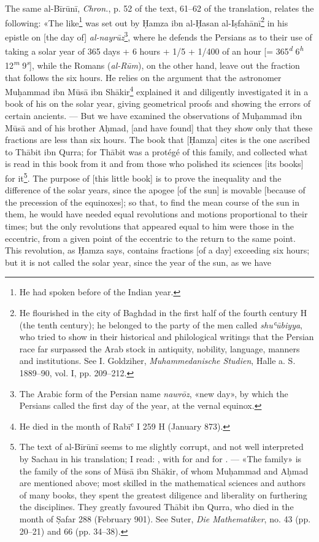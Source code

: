 \documentclass[11pt]{article}
\newcommand{\Pg}[1]{\marginpar{\footnotesize\color{gray}#1}}
\begin{document}
\par \Pg{I 208}The same al-Bīrūnī, \emph{Chron.}, p. 52 of the text, 61–62 of the translation, relates the following: «The like\footnote{He had spoken before of the Indian year.} was set out by Ḥamza ibn al-Ḥasan al-Iṣfahānī\footnote{He flourished in the city of Baghdad in the first half of the fourth century H (the tenth century); he belonged to the party of the men called \emph{shuʿūbiyya}, who tried to show in their historical and philological writings that the Persian race far surpassed the Arab stock in antiquity, nobility, language, manners and institutions. See I. Goldziher, \emph{Muhammedanische Studien}, Halle a. S. 1889–90, vol. I, pp. 209–212.} in his epistle on [the day of] \emph{al-nayrūz}\footnote{The Arabic form of the Persian name \emph{nawrōz}, «new day», by which the Persians called the first day of the year, at the vernal equinox.}, where he defends the Persians as to their use of taking a solar year of 365 days + 6 hours + 1/5 + 1/400 of an hour [= 365\textsuperscript{\itshape d} 6\textsuperscript{\itshape h} 12\textsuperscript{\itshape m} 9\textsuperscript{\itshape s}], while the Romans (\emph{al-Rūm}), on the other hand, leave out the fraction that follows the six hours. He relies on the argument that the astronomer Muḥammad ibn Mūsā ibn Shākir\footnote{He died in the month of Rabīʿ I 259 H (January 873).} explained it and diligently investigated it in a book of his on the solar year, giving geometrical proofs and showing the errors of certain ancients. — But we have examined the observations of Muḥammad ibn Mūsā and of his brother Aḥmad, [and have found] that they show only that these fractions are less than six hours. The book that [Ḥamza] cites is the one ascribed to Thābit ibn Qurra; for Thābit was a protégé of this family, and collected what is read in this book from it and from those who polished its sciences [its books] for it\footnote{The text of al-Bīrūnī seems to me slightly corrupt, and not well interpreted by Sachau in his translation; I read: , with  for  and  for . — «The family» is the family of the sons of Mūsā ibn Shākir, of whom Muḥammad and Aḥmad are mentioned above; most skilled in the mathematical sciences and authors of many books, they spent the greatest diligence and liberality on furthering the disciplines. They greatly favoured Thābit ibn Qurra, who died in the month of Ṣafar 288 (February 901). See Suter, \emph{Die Mathematiker}, no. 43 (pp. 20–21) and 66 (pp. 34–38).}. The purpose of [this little book] is to prove the inequality and the difference of the solar years, since the apogee [of the sun] is movable [because of the precession of the equinoxes]; so that, to find the mean course of the sun in them, he would have needed equal revolutions and motions proportional to their times; but the only revolutions that appeared equal to him were those in the eccentric, from a given point of the eccentric to the return to the same point. This revolution, as Ḥamza says, contains fractions [of a day] exceeding six hours; but it is not called the solar year, since the year of the sun, as we have 
\end{document}
